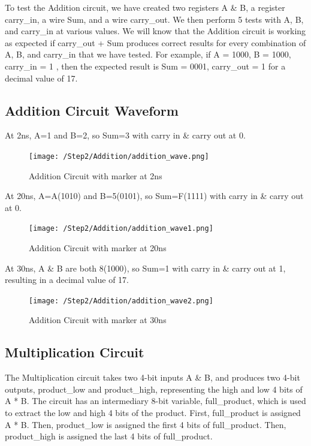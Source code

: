 \documentclass[12pt]{article}
\begin{document}
To test the Addition circuit, we have created two registers A & B, a register carry_in, a wire Sum, and a wire carry_out. We then perform 5 tests with A, B, and carry_in at various values. We will know that the Addition circuit is working as expected if carry_out + Sum produces correct results for every combination of A, B, and carry_in that we have tested. For example, if A = 1000, B = 1000, carry_in = 1 , then the expected result is Sum = 0001, carry_out = 1 for a decimal value of 17.
 

\subsection{Addition Circuit Waveform} 

At 2ns, A=1 and B=2, so Sum=3 with  carry in & carry out at 0.
\begin{figure}[h]
 \centering
 \texttt{[image: /Step2/Addition/addition\_wave.png]}
 \caption{Addition Circuit with marker at 2ns}
 \label{fig:enter-label} 
\end{figure} 

At 20ns, A=A(1010) and B=5(0101), so Sum=F(1111) with carry in & carry out at 0.
 \begin{figure}[h]
 \centering 
\texttt{[image: /Step2/Addition/addition\_wave1.png]}
 \caption{Addition Circuit with marker at 20ns}
 \label{fig:enter-label}
 \end{figure}

At 30ns, A & B are both 8(1000), so Sum=1 with carry in & carry out at 1, resulting in a decimal value of 17.
 \begin{figure}[h]
 \centering 
\texttt{[image: /Step2/Addition/addition\_wave2.png]}
 \caption{Addition Circuit with marker at 30ns}
 \label{fig:enter-label}
 \end{figure}

\subsection{Multiplication Circuit}
The Multiplication circuit takes two 4-bit inputs A & B, and produces two 4-bit outputs, product_low and product_high, representing the high and low 4 bits of A * B. The circuit has an intermediary 8-bit variable, full_product, which is used to extract the low and high 4 bits of the product. First, full_product is assigned A * B. Then, product_low is assigned the first 4 bits of full_product. Then, product_high is assigned the last 4 bits of full_product. 
 
\end{document}
